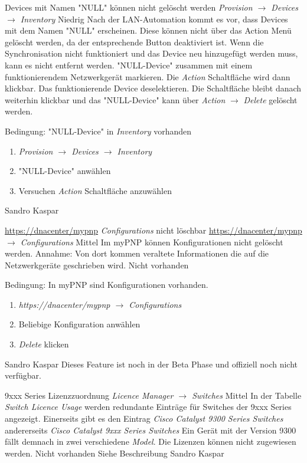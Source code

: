 \bugreport
{Devices mit Namen "NULL" können nicht gelöscht werden}
{\textit{Provision $\rightarrow$ Devices $\rightarrow$ Inventory}}
{Niedrig}
{Nach der LAN-Automation kommt es vor, dass Devices mit dem Namen "NULL" erscheinen. Diese können nicht über das Action Menü gelöscht werden, da der entsprechende Button deaktiviert ist.}
{Wenn die Synchronisation nicht funktioniert und das Device neu hinzugefügt werden muss, kann es nicht entfernt werden.}
{"NULL-Device" zusammen mit einem funktionierendem Netzwerkgerät markieren. Die \textit{Action} Schaltfläche wird dann klickbar. Das funktionierende Device deselektieren. Die Schaltfläche bleibt danach weiterhin klickbar und das "NULL-Device" kann über \textit{Action} $\rightarrow$ \textit{Delete} gelöscht werden.}
{
	Bedingung: "NULL-Device" in \textit{Inventory} vorhanden
	\begin{enumerate}
		\item \textit{Provision $\rightarrow$ Devices $\rightarrow$ Inventory}
		\item "NULL-Device" anwählen
		\item Versuchen \textit{Action} Schaltfläche anzuwählen
	\end{enumerate}
}
{Sandro Kaspar}
{}

\bugreport
{\url{https://dnacenter/mypnp} \textit{Configurations} nicht löschbar}
{\url{https://dnacenter/mypnp} \textit{$\rightarrow$ Configurations}}
{Mittel}
{Im myPNP können Konfigurationen nicht gelöscht werden.}
{Annahme: Von dort kommen veraltete Informationen die auf die Netzwerkgeräte geschrieben wird.}
{Nicht vorhanden}
{
	Bedingung: In myPNP sind Konfigurationen vorhanden.
	\begin{enumerate}
		\item \textit{https://dnacenter/mypnp $\rightarrow$ Configurations}
		\item Beliebige Konfiguration anwählen
		\item \textit{Delete} klicken
	\end{enumerate}
}
{Sandro Kaspar}
{Dieses Feature ist noch in der Beta Phase und offiziell noch nicht verfügbar.}


\bugreport
{9xxx Series Lizenzzuordnung}
{\textit{Licence Manager $\rightarrow$ Switches}}
{Mittel}
{In der Tabelle \textit{Switch Licence Usage} werden redundante Einträge für Switches der 9xxx Series angezeigt. Einerseits gibt es den Eintrag \textit{Cisco Catalyst 9300 Series Switches} andererseits \textit{Cisco Catalyst 9xxx Series Switches} Ein Gerät mit der Version 9300 fällt demnach in zwei verschiedene \textit{Model}.}
{Die Lizenzen können nicht zugewiesen werden.}
{Nicht vorhanden}
{
Siehe Beschreibung
}
{Sandro Kaspar}
{}



